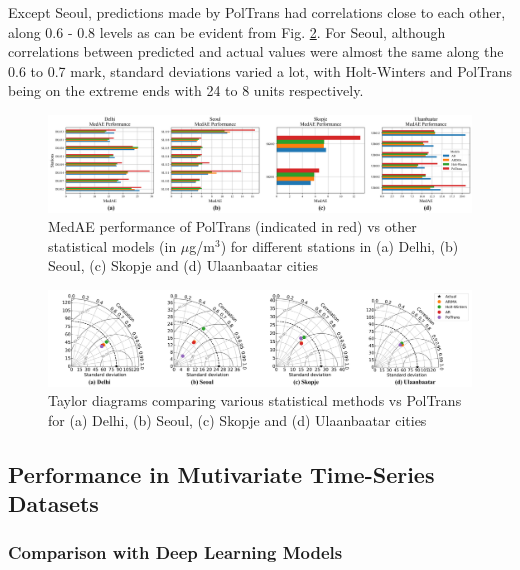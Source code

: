 \documentclass[twocolumn]{svjour3}          %
\begin{document}
Except Seoul, predictions made by {PolTrans} had correlations close to each other, along 0.6 - 0.8 levels as can be evident from Fig. \ref{fig:stat-taylor}. For Seoul, although correlations between predicted and actual values were almost the same along the 0.6 to 0.7 mark, standard deviations varied a lot, with Holt-Winters and {PolTrans} being on the extreme ends with 24 to 8 units respectively.

\begin{figure}[h]
\centering
\includegraphics[scale=0.365]{./stat_medae.png}
\caption{MedAE performance of {PolTrans} (indicated in red) vs other statistical models (in $\mu$g/m$^{3}$) for different stations in (a) Delhi, (b) Seoul, (c) Skopje and (d) Ulaanbaatar cities}
\label{fig:stat-medae}
\end{figure}

\begin{figure}[h]
\centering
\includegraphics[width=18cm]{./merged_taylor_stat.png}
\caption{Taylor diagrams comparing various statistical methods vs {PolTrans} for (a) Delhi, (b) Seoul, (c) Skopje and (d) Ulaanbaatar cities}
\label{fig:stat-taylor}
\end{figure}

\subsection{Performance in Mutivariate Time-Series Datasets}

\subsubsection{Comparison with Deep Learning Models}
\end{document}
